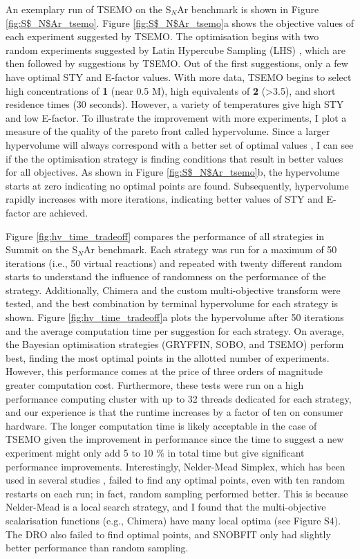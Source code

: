 An exemplary run of TSEMO on the S$_N$Ar benchmark is shown in Figure \ref{fig:S$_N$Ar_tsemo}. Figure \ref{fig:S$_N$Ar_tsemo}a shows the objective values of each experiment suggested by TSEMO. The optimisation begins with two random experiments suggested by Latin Hypercube Sampling (LHS) \cite{McKay1979}, which are then followed by suggestions by TSEMO. Out of the first suggestions, only a few have optimal STY and E-factor values. With more data, TSEMO begins to select high concentrations of \textbf{1} (near 0.5 M), high equivalents of \textbf{2} (>3.5), and short residence times (30 seconds). However, a variety of temperatures give high STY and low E-factor. To illustrate the improvement with more experiments, I plot a measure of the quality of the pareto front called hypervolume. Since a larger hypervolume will always correspond with a better set of optimal values \cite{Zitzler2003}, I can see if the the optimisation strategy is finding conditions that result in better values for all objectives. As shown in Figure \ref{fig:S$_N$Ar_tsemo}b, the hypervolume starts at zero indicating no optimal points are found. Subsequently, hypervolume rapidly increases with more iterations, indicating better values of STY and E-factor are achieved.

Figure \ref{fig:hv_time_tradeoff} compares the performance of all strategies in Summit on the S$_N$Ar benchmark. Each strategy was run for a maximum of 50 iterations (i.e., 50 virtual reactions) and repeated with twenty different random starts to understand the influence of randomness on the performance of the strategy. Additionally, Chimera and the custom multi-objective transform were tested, and the best combination by terminal hypervolume for each strategy is shown. Figure \ref{fig:hv_time_tradeoff}a plots the hypervolume after 50 iterations and the average computation time per suggestion for each strategy. On average, the Bayesian optimisation strategies (GRYFFIN, SOBO, and TSEMO) perform best, finding the most optimal points in the allotted number of experiments. However, this performance comes at the price of three orders of magnitude greater computation cost. Furthermore, these tests were run on a high performance computing cluster with up to 32 threads dedicated for each strategy, and our experience is that the runtime increases by a factor of ten on consumer hardware.  The longer computation time is likely acceptable in the case of TSEMO given the improvement in performance since the time to suggest a new experiment might only add 5 to 10 \% in total time but give significant performance improvements. Interestingly, Nelder-Mead Simplex, which has been used in several studies \cite{McMullen2010b, Parrott2011, Sans2015, CortesBorda2016, Fitzpatrick2016, McMullen2010a, Poscharny2018}, failed to find any optimal points, even with ten random restarts on each run; in fact, random sampling performed better. This is because Nelder-Mead is a local search strategy, and I found that the multi-objective scalarisation functions (e.g., Chimera) have many local optima (see Figure S4). The DRO also failed to find optimal points, and SNOBFIT only had slightly better performance than random sampling.

